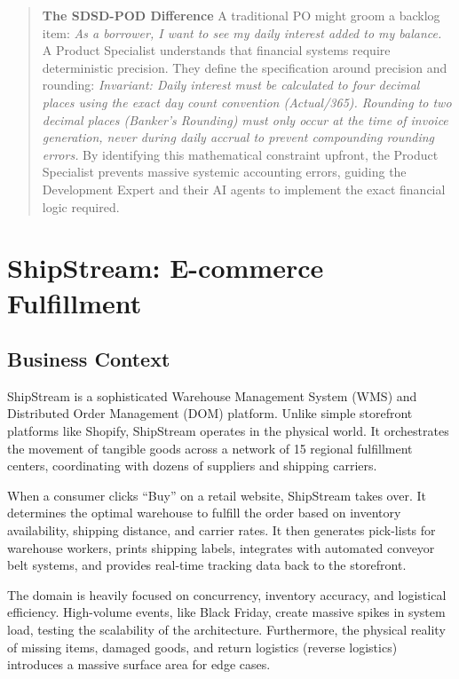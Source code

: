 \begin{quote}
\textbf{The SDSD-POD Difference} A traditional PO might groom a backlog
item: \emph{As a borrower, I want to see my daily interest added to my
balance.} A Product Specialist understands that financial systems
require deterministic precision. They define the specification around
precision and rounding: \emph{Invariant: Daily interest must be
calculated to four decimal places using the exact day count convention
(Actual/365). Rounding to two decimal places (Banker's Rounding) must
only occur at the time of invoice generation, never during daily accrual
to prevent compounding rounding errors.} By identifying this
mathematical constraint upfront, the Product Specialist prevents massive
systemic accounting errors, guiding the Development Expert and their AI
agents to implement the exact financial logic required.
\end{quote}

\bigskip

\section{ShipStream: E-commerce
Fulfillment}\label{shipstream-e-commerce-fulfillment}

\subsection{Business Context}\label{business-context-2}

ShipStream is a sophisticated Warehouse Management System (WMS) and
Distributed Order Management (DOM) platform. Unlike simple storefront
platforms like Shopify, ShipStream operates in the physical world. It
orchestrates the movement of tangible goods across a network of 15
regional fulfillment centers, coordinating with dozens of suppliers and
shipping carriers.

When a consumer clicks ``Buy'' on a retail website, ShipStream takes
over. It determines the optimal warehouse to fulfill the order based on
inventory availability, shipping distance, and carrier rates. It then
generates pick-lists for warehouse workers, prints shipping labels,
integrates with automated conveyor belt systems, and provides real-time
tracking data back to the storefront.

The domain is heavily focused on concurrency, inventory accuracy, and
logistical efficiency. High-volume events, like Black Friday, create
massive spikes in system load, testing the scalability of the
architecture. Furthermore, the physical reality of missing items,
damaged goods, and return logistics (reverse logistics) introduces a
massive surface area for edge cases.

